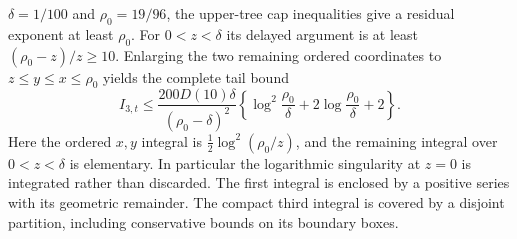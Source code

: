 $\delta=1/100$ and $\rho_0=19/96$, the upper-tree cap
inequalities give a residual exponent at least $\rho_0$.
For $0<z<\delta$ its delayed argument is at least
$(\rho_0-z)/z\ge10$.  Enlarging the two remaining ordered
coordinates to $z\le y\le x\le\rho_0$ yields the complete
tail bound
\begin{equation}
 I_{3,t}\le
 \frac{200D(10)\delta}{(\rho_0-\delta)^2}
 \left\{\log^2\frac{\rho_0}{\delta}
        +2\log\frac{\rho_0}{\delta}+2\right\}.
 \label{num:complete-tail}
\end{equation}
Here the ordered $x,y$ integral is
$\tfrac12\log^2(\rho_0/z)$, and the remaining integral
over $0<z<\delta$ is elementary.  In particular the
logarithmic singularity at $z=0$ is integrated rather
than discarded.  The first integral is
enclosed by a positive series with its geometric remainder.
The compact third integral is covered by a disjoint partition,
including conservative bounds on its boundary boxes.

